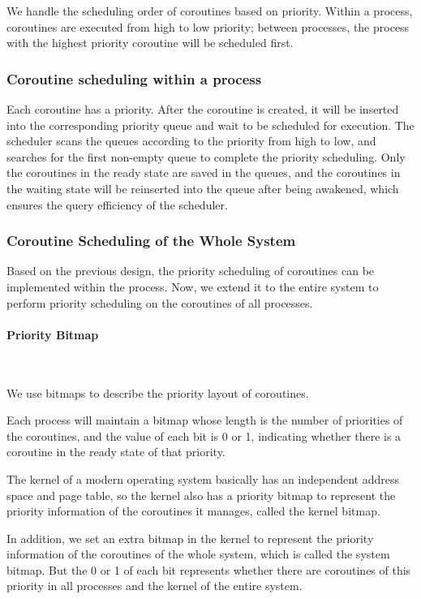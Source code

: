 \documentclass[10pt]{article}
\begin{document}
We handle the scheduling order of coroutines based on priority. Within a process, coroutines are executed from high to low priority; between processes, the process with the highest priority coroutine will be scheduled first. 

\subsubsection{Coroutine scheduling within a process}

Each coroutine has a priority. After the coroutine is created, it will be inserted into the corresponding priority queue and wait to be scheduled for execution. The scheduler scans the queues according to the priority from high to low, and searches for the first non-empty queue to complete the priority scheduling. Only the coroutines in the ready state are saved in the queues, and the coroutines in the waiting state will be reinserted into the queue after being awakened, which ensures the query efficiency of the scheduler.

\subsubsection{Coroutine Scheduling of the Whole System}

Based on the previous design, the priority scheduling of coroutines can be implemented within the process. Now, we extend it to the entire system to perform priority scheduling on the coroutines of all processes. 

\paragraph{Priority Bitmap}~{}

We use bitmaps to describe the priority layout of coroutines.

Each process will maintain a bitmap whose length is the number of priorities of the coroutines, and the value of each bit is 0 or 1, indicating whether there is a coroutine in the ready state  of that priority. 

The kernel of a modern operating system basically has an independent address space and page table, so the kernel also has a priority bitmap to represent the priority information of the coroutines it manages, called the kernel bitmap.

In addition, we set an extra bitmap in the kernel to represent the priority information of the coroutines of the whole system, which is called the system bitmap. But the 0 or 1 of each bit represents whether there are coroutines of this priority in all processes and the kernel of the entire system.
\end{document}
